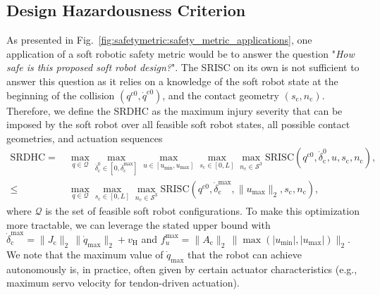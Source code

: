 \subsection{Design Hazardousness Criterion}
As presented in Fig.~\ref{fig:safetymetric:safety_metric_applications}, one application of a soft robotic safety metric would be to answer the question "\emph{How safe is this proposed soft robot design?}". The \gls{SRISC} on its own is not sufficient to answer this question as it relies on a knowledge of the soft robot state at the beginning of the collision $(q^{\mathrm{c}0}, \dot{q}^{\mathrm{c}0})$, and the contact geometry $(s_\mathrm{c},n_\mathrm{c})$.
Therefore, we define the \gls{SRDHC} as the maximum injury severity that can be imposed by the soft robot over all feasible soft robot states, all possible contact geometries, and actuation sequences
\begin{equation}
\begin{split}
    \mathrm{SRDHC} =& \: \max_{q \in \mathcal{Q}} \max_{\dot{\delta}_\mathrm{c}^0 \in [0,\dot{\delta}_\mathrm{c}^\mathrm{max}]} \max_{u \in [u_\mathrm{min}, u_\mathrm{max}]} \max_{s_\mathrm{c} \in [0,L]} \max_{n_\mathrm{c} \in \mathcal{S}^3} \mathrm{SRISC}(q^{\mathrm{c}0},\dot{\delta}_\mathrm{c}^0,u,s_\mathrm{c},n_\mathrm{c}),\\
    \leq& \: \max_{q \in \mathcal{Q}} \max_{s_\mathrm{c} \in [0,L]} \max_{n_\mathrm{c} \in \mathcal{S}^3} \mathrm{SRISC}(q^{\mathrm{c}0},\dot{\delta}_\mathrm{c}^\mathrm{max},\lVert u_\mathrm{max} \rVert_2,s_\mathrm{c},n_\mathrm{c}),
\end{split}
\end{equation}
where $\mathcal{Q}$ is the set of feasible soft robot configurations.
To make this optimization more tractable, we can leverage the stated upper bound with $\dot{\delta}_\mathrm{c}^\mathrm{max} = \lVert J_\mathrm{c} \rVert_2 \, \lVert \dot{q}_\mathrm{max} \rVert_2 + v_\mathrm{H}$
and $f_u^\mathrm{max} = \lVert A_\mathrm{c} \rVert_2 \, \lVert \max(|u_\mathrm{min}|,|u_\mathrm{max}|) \rVert_2$.
We note that the maximum value of $\dot{q}_\mathrm{max}$ that the robot can achieve autonomously is, in practice, often given by certain actuator characteristics (e.g., maximum servo velocity for tendon-driven actuation).